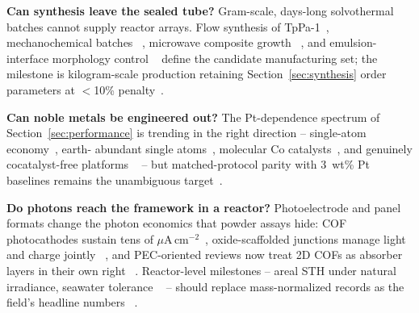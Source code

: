 \textbf{Can synthesis leave the sealed tube?} Gram-scale, days-long
solvothermal batches cannot supply reactor arrays. Flow synthesis of
TpPa-1~\cite{xu2026structural}, mechanochemical batches
~\cite{asokan2026structure}, microwave composite growth
~\cite{gao2025microwave}, and emulsion-interface morphology control
~\cite{ma2024rapid} define the candidate manufacturing set; the milestone
is kilogram-scale production retaining Section~\ref{sec:synthesis} order
parameters at $<$10\% penalty~\cite{wu2025recent,khalil2024two}.

\textbf{Can noble metals be engineered out?} The Pt-dependence spectrum of
Section~\ref{sec:performance} is trending in the right direction --
single-atom economy~\cite{dong2021platinum,tang2025engineering}, earth-
abundant single atoms~\cite{wang2024single,osemba2026synergistic,
younas2024a}, molecular Co catalysts~\cite{gottschling2020rational,
huang2025enantioselective}, and genuinely cocatalyst-free platforms
~\cite{ma2025engineering,zhang2025dual,zhao2025cocatalyst,yan2023metal} --
but matched-protocol parity with 3~wt\% Pt baselines remains the
unambiguous target~\cite{qu2024covalent}.

\textbf{Do photons reach the framework in a reactor?} Photoelectrode and
panel formats change the photon economics that powder assays hide: COF
photocathodes sustain tens of $\mu$A\,cm$^{-2}$~\cite{jia2025copper,
lu2024copper}, oxide-scaffolded junctions manage light and charge jointly
~\cite{niu2026fluorine,hao2025covalent}, and PEC-oriented reviews now
treat 2D COFs as absorber layers in their own right
~\cite{guntermann2026recent,peng2025sp2}. Reactor-level milestones --
areal STH under natural irradiance, seawater tolerance
~\cite{yu2025topology,zhong2023oligo,zhang2025dual} -- should replace
mass-normalized records as the field's headline numbers
~\cite{zhou2023recent,niu2023review}.
